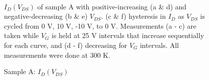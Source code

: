 \begin{figure}
\begin{centering}
{}
\par\end{centering}
\noindent \begin{centering}
~~~~\caption{Sample A: $I_{D}\left(V_{DS}\right)$\label{fig:In2Se3-SampleA-I_DSvV_DS}}
\par\end{centering}
$I_{D}\left(V_{DS}\right)$ of sample A with positive-increasing (a
\& d) and negative-decreasing (b \& e) $V_{DS}$. (c \& f) hysteresis
in $I_{D}$ as $V_{DS}$ is cycled from 0 V, 10 V, -10 V, to 0 V.
Measurements (a - c) are taken while $V_{G}$ is held at 25 V intervals
that increase sequentially for each curve, and (d - f) decreasing
for $V_{G}$ intervals. All measurements were done at 300 K.
\end{figure}

